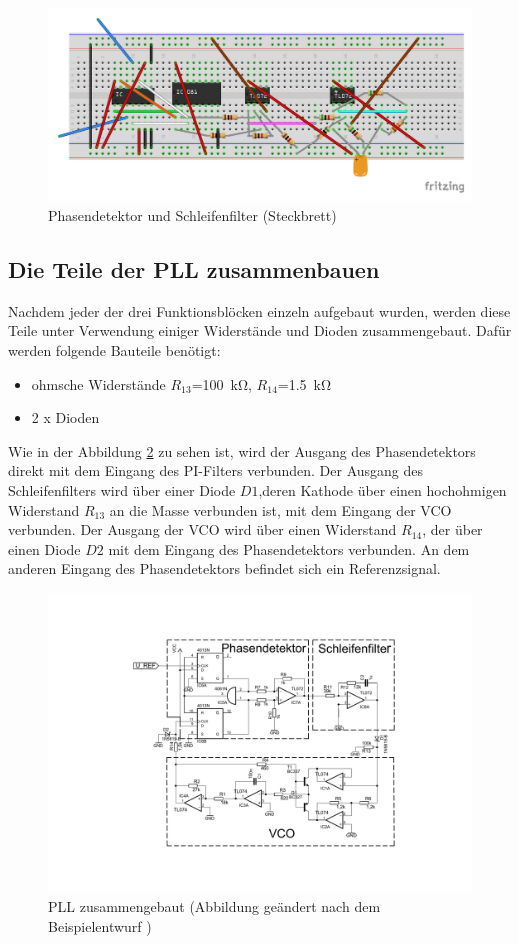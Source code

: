 \begin{figure}[H]
  \centering
  \includegraphics[width=0.8\linewidth]{Elektronik-Laborprotokoll_PLL/circuits/Phasendetektor_und_Filter_circuit.pdf}
  \caption{Phasendetektor und Schleifenfilter (Steckbrett)}
  \label{fig:Pd_und_PI_circuit}
\end{figure}

\subsection{Die Teile der PLL zusammenbauen}

Nachdem jeder der drei Funktionsblöcken einzeln aufgebaut wurden, werden diese Teile unter Verwendung einiger Widerstände und Dioden zusammengebaut. Dafür werden folgende Bauteile benötigt:

\begin{itemize}
    \item ohmsche Widerstände $R_{13}$=\SI{100}{\kilo\ohm}, $R_{14}$=\SI{1,5}{\kilo\ohm}
    \item  2 x Dioden
\end{itemize}

Wie in der Abbildung \ref{fig:PLL_zusammengebaut} zu sehen ist, wird der Ausgang des Phasendetektors direkt mit dem Eingang des PI-Filters verbunden. Der Ausgang des Schleifenfilters wird über einer Diode $D1$,deren Kathode über einen hochohmigen Widerstand $R_{13}$ an die Masse verbunden ist, mit dem Eingang der VCO verbunden. Der Ausgang der VCO wird über einen Widerstand $R_{14}$, der über einen Diode $D2$ mit dem Eingang des Phasendetektors verbunden. An dem anderen Eingang des Phasendetektors befindet sich ein Referenzsignal.


\begin{figure}[H]
  \centering
  \includegraphics[width=1\linewidth]{Elektronik-Laborprotokoll_PLL/Abbildungen/PLL_Schaltung_zusammengebaut.pdf}
  \caption{PLL zusammengebaut (Abbildung geändert nach dem Beispielentwurf \cite{SkriptElektronik})}
  \label{fig:PLL_zusammengebaut}
\end{figure}


